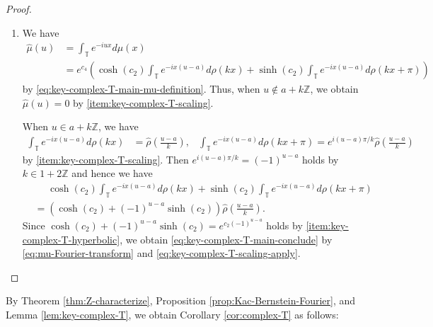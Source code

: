 \documentclass[12pt]{article}
\theoremstyle{definition}
\theoremstyle{remark}
\numberwithin{equation}{section}
\numberwithin{figure}{section}
\numberwithin{table}{section}
\begin{document}
\begin{proof}
\begin{enumerate}
\item

We have
\begin{align}
    \hat{ \mu } ( u )
    & = \int_{ \mathbb{ T } } e^{ - i u x } d \mu ( x ) \\
    & = e^{ c_4 } \left( \cosh ( c_2 ) \int_{ \mathbb{ T } } e^{ - i x ( u - a ) } d \rho ( k x ) + \sinh ( c_2 ) \int_{ \mathbb{ T } } e^{ - i x ( u - a ) } d \rho ( k x + \pi ) \right) \label{eq:mu-Fourier-transform}
\end{align}
by \eqref{eq:key-complex-T-main-mu-definition}.
Thus, when $ u \notin a + k \mathbb{ Z } $, we obtain $ \hat{ \mu } ( u ) = 0 $ by \ref{item:key-complex-T-scaling}.

When $ u \in a + k \mathbb{ Z } $, we have
\begin{align}
    \int_{ \mathbb{ T } } e^{ - i x ( u - a ) } d \rho ( k x )
    & = \hat{ \rho } \left( \frac{ u - a }{ k } \right), &
    \int_{ \mathbb{ T } } e^{ - i x ( u - a ) } d \rho ( k x + \pi )
    = e^{ i ( u - a ) \pi / k } \hat{ \rho } \left( \frac{ u - a }{ k } \right)
\end{align}
by \ref{item:key-complex-T-scaling}.
Then $ e^{ i ( u - a ) \pi / k } = ( - 1 )^{ u - a } $ holds by $ k \in 1 + 2 \mathbb{ Z } $ and hence we have
\begin{align}
    & \phantom{ { } = { } }\cosh ( c_2 ) \int_{ \mathbb{ T } } e^{ - i x ( u - a ) } d \rho ( k x ) + \sinh ( c_2 ) \int_{ \mathbb{ T } } e^{ - i x ( u - a ) } d \rho ( k x + \pi ) \\
    & = ( \cosh ( c_2 ) + ( - 1 )^{ u - a } \sinh ( c_2 ) ) \hat{ \rho } \left( \frac{ u - a }{ k } \right). \label{eq:key-complex-T-scaling-apply}
\end{align}
Since $ \cosh ( c_2 ) + ( - 1 )^{ u - a } \sinh ( c_2 ) = e^{ c_2 ( - 1 )^{ u - a } } $ holds by \ref{item:key-complex-T-hyperbolic}, we obtain \eqref{eq:key-complex-T-main-conclude} by \eqref{eq:mu-Fourier-transform} and \eqref{eq:key-complex-T-scaling-apply}.
\qedhere
\end{enumerate}
    
\end{proof}

By Theorem \ref{thm:Z-characterize}, Proposition \ref{prop:Kac-Bernstein-Fourier}, and Lemma \ref{lem:key-complex-T}, we obtain Corollary \ref{cor:complex-T} as follows:
\end{document}
